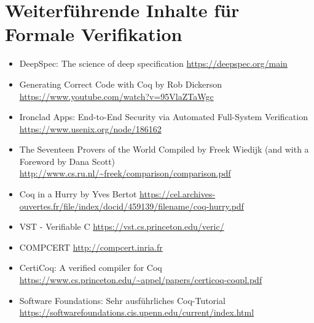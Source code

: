 \section{Weiterführende Inhalte für Formale Verifikation}
\label{a:append}

\begin{itemize}
	\item DeepSpec: The science of deep specification \url{https://deepspec.org/main}
	\item Generating Correct Code with Coq by Rob Dickerson \url{https://www.youtube.com/watch?v=95VlaZTaWgc}
	\item Ironclad Apps: End-to-End Security via Automated Full-System Verification \url{https://www.usenix.org/node/186162}
	\item The Seventeen Provers of the World Compiled by Freek Wiedijk
	(and with a Foreword by Dana Scott)
	\url{http://www.cs.ru.nl/~freek/comparison/comparison.pdf}
	\item Coq in a Hurry by Yves Bertot \url{https://cel.archives-ouvertes.fr/file/index/docid/459139/filename/coq-hurry.pdf}
	\item VST - Verifiable C \url{https://vst.cs.princeton.edu/veric/}
	\item COMPCERT \url{http://compcert.inria.fr}
	\item CertiCoq: A verified compiler for Coq
	\url{https://www.cs.princeton.edu/~appel/papers/certicoq-coqpl.pdf}
	\item Software Foundations: Sehr ausführliches Coq-Tutorial \url{https://softwarefoundations.cis.upenn.edu/current/index.html}
\end{itemize} 

